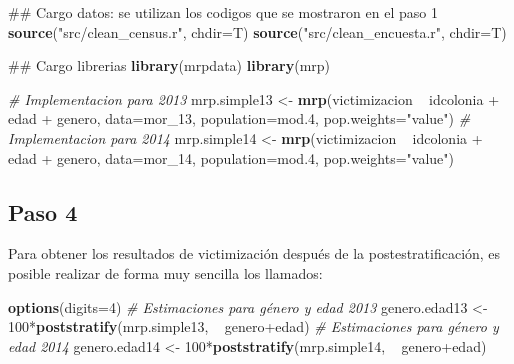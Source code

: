 \documentclass[]{article}
\newenvironment{Shaded}{\begin{snugshade}}{\end{snugshade}}
\newcommand{\KeywordTok}[1]{\textcolor[rgb]{0.13,0.29,0.53}{\textbf{{#1}}}}
\newcommand{\DataTypeTok}[1]{\textcolor[rgb]{0.13,0.29,0.53}{{#1}}}
\newcommand{\DecValTok}[1]{\textcolor[rgb]{0.00,0.00,0.81}{{#1}}}
\newcommand{\FloatTok}[1]{\textcolor[rgb]{0.00,0.00,0.81}{{#1}}}
\newcommand{\StringTok}[1]{\textcolor[rgb]{0.31,0.60,0.02}{{#1}}}
\newcommand{\CommentTok}[1]{\textcolor[rgb]{0.56,0.35,0.01}{\textit{{#1}}}}
\newcommand{\NormalTok}[1]{{#1}}
\begin{document}
\begin{Shaded}
\begin{Highlighting}[]
\NormalTok{## Cargo datos: se utilizan los codigos que se mostraron en el paso 1}
\KeywordTok{source}\NormalTok{(}\StringTok{"src/clean_census.r"}\NormalTok{, }\DataTypeTok{chdir=}\NormalTok{T)}
\KeywordTok{source}\NormalTok{(}\StringTok{"src/clean_encuesta.r"}\NormalTok{, }\DataTypeTok{chdir=}\NormalTok{T)}

\NormalTok{## Cargo librerias}
\KeywordTok{library}\NormalTok{(mrpdata)}
\KeywordTok{library}\NormalTok{(mrp)}

\CommentTok{# Implementacion para 2013}
\NormalTok{mrp.simple13 <-}\StringTok{ }\KeywordTok{mrp}\NormalTok{(victimizacion ~}\StringTok{ }\NormalTok{idcolonia +}\StringTok{ }\NormalTok{edad +}\StringTok{ }\NormalTok{genero,}
                  \DataTypeTok{data=}\NormalTok{mor_13,}
                  \DataTypeTok{population=}\NormalTok{mod}\FloatTok{.4}\NormalTok{,}
                  \DataTypeTok{pop.weights=}\StringTok{"value"}\NormalTok{)}
\CommentTok{# Implementacion para 2014}
\NormalTok{mrp.simple14 <-}\StringTok{ }\KeywordTok{mrp}\NormalTok{(victimizacion ~}\StringTok{ }\NormalTok{idcolonia +}\StringTok{ }\NormalTok{edad +}\StringTok{ }\NormalTok{genero,}
                    \DataTypeTok{data=}\NormalTok{mor_14,}
                    \DataTypeTok{population=}\NormalTok{mod}\FloatTok{.4}\NormalTok{,}
                    \DataTypeTok{pop.weights=}\StringTok{"value"}\NormalTok{)}
\end{Highlighting}
\end{Shaded}

\subsection{Paso 4}\label{paso-4}

Para obtener los resultados de victimización después de la
postestratificación, es posible realizar de forma muy sencilla los
llamados:

\begin{Shaded}
\begin{Highlighting}[]
\KeywordTok{options}\NormalTok{(}\DataTypeTok{digits=}\DecValTok{4}\NormalTok{)}
\CommentTok{# Estimaciones para género y edad 2013}
\NormalTok{genero.edad13 <-}\StringTok{ }\DecValTok{100}\NormalTok{*}\KeywordTok{poststratify}\NormalTok{(mrp.simple13, ~}\StringTok{ }\NormalTok{genero+edad)}
\CommentTok{# Estimaciones para género y edad 2014}
\NormalTok{genero.edad14 <-}\StringTok{ }\DecValTok{100}\NormalTok{*}\KeywordTok{poststratify}\NormalTok{(mrp.simple14, ~}\StringTok{ }\NormalTok{genero+edad)}
\end{Highlighting}
\end{Shaded}
\end{document}
